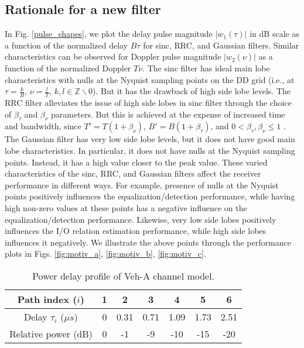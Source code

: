\subsection{Rationale for a new filter}
In Fig. \ref{pulse_shapes}, we plot the delay pulse magnitude $|w_1(\tau)|$ in dB scale as a function of the normalized delay $B\tau$ for sinc, RRC, and Gaussian filters. Similar characteristics can be observed for Doppler pulse magnitude $|w_2(\nu)|$ as a function of the normalized Doppler $T\nu$. The sinc filter has ideal main lobe characteristics with nulls at the Nyquist sampling points on the DD grid (i.e., at $\tau=\frac{k}{B}$, $\nu=\frac{l}{T}$, $k,l \in \mathbb{Z}\backslash 0$). But it has the drawback of high side lobe levels. The RRC filter alleviates the issue of high side lobes in sinc filter through the choice of $\beta_\tau$ and $\beta_\nu$ parameters. But this is achieved at the expense of increased time and bandwidth, since $T'=T(1+\beta_\nu)$, $B'=B(1+\beta_\tau)$, and $0< \beta_\tau,\beta_\nu \leq 1$ . The Gaussian filter has very low side lobe levels, but it does not have good main lobe characteristics. In particular, it does not have nulls at the Nyquist sampling points. Instead, it has a high value closer to the peak value. These varied characteristics of the sinc, RRC, and Gaussian filters affect the receiver performance in different ways. For example, presence of nulls at the Nyquist points positively influences the equalization/detection performance, while having high non-zero values at these points has a negative influence on the equalization/detection performance. Likewise, very low side lobes positively influences the I/O relation estimation performance, while high side lobes influences it negatively. We illustrate the above points through the performance plots in Figs. \ref{fig:motiv_a}, \ref{fig:motiv_b}, \ref{fig:motiv_c}.
\begin{table}
\centering
\begin{tabular}{|c|c|c|c|c|c|c|}
\hline
Path index ($i$)         & 1 & 2    & 3    & 4    & 5    & 6    \\ \hline
Delay $\tau_{i}$ ($\mu s$)      & 0 & 0.31 & 0.71 & 1.09 & 1.73 & 2.51 \\ \hline
Relative power 
(dB) & 0 & -1   & -9   & -10  & -15  & -20  \\ \hline
\end{tabular}
\caption{Power delay profile of Veh-A channel model.}
\label{tab_pdp}
\vspace{-5mm}
\end{table}

